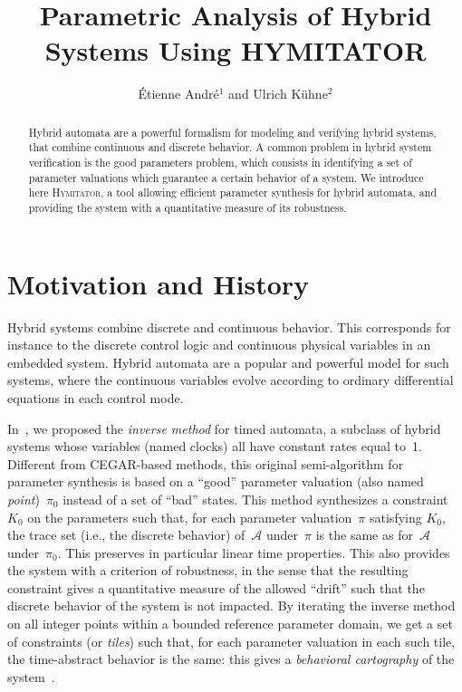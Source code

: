 \documentclass{llncs}
\title{Parametric Analysis of Hybrid Systems Using HYMITATOR}
\author{\'Etienne Andr\'e$^1$ and %
	Ulrich K\"uhne$^2$%
	}
\institute{$^1$LIPN, CNRS UMR 7030, Université Paris 13, France \\
$^2$Group for Computer Architecture, University of Bremen, Germany}
\newcommand{\A}{\mathcal{A}}
\newcommand{\Ko}{K_0}
\newcommand{\pio}{\pi_0}
\newcommand{\piprime}{\pi}
\newcommand{\hymitator}{\textsc{Hymitator}}
\newcommand{\commentaire}[1]{}
\begin{document}
\maketitle

\begin{abstract}
	Hybrid automata are a powerful formalism for modeling and verifying hybrid systems, that combine continuous and discrete behavior.
	A common problem in hybrid system verification is the good parameters problem, which consists in identifying a set of parameter valuations which guarantee a certain behavior of a system.
	We introduce here \hymitator{}, a tool allowing efficient parameter synthesis for hybrid automata, and providing the system with a quantitative measure of its robustness.
\end{abstract}


\commentaire{Version avec commentaires}


\section{Motivation and History}


Hybrid systems combine discrete and continuous behavior.
This corresponds for instance to the discrete control logic and continuous physical variables in an embedded system.
Hybrid automata are a popular and powerful model for such systems, where the continuous variables evolve according to ordinary differential equations in each control mode.

In~\cite{acef09}, we proposed the \emph{inverse method} for timed automata, a subclass of hybrid systems whose variables (named clocks) all have constant rates equal to~1.
Different from CEGAR-based methods, this original semi-algorithm for parameter synthesis is based on a ``good'' parameter valuation (also named \emph{point})~$\pio$ instead of a set of ``bad'' states.
This method synthesizes a constraint~$\Ko$ on the parameters such that, for each parameter valuation~$\piprime$ satisfying $\Ko$, the trace set (i.e., the discrete behavior) of~$\A$ under~$\piprime$ is the same as for~$\A$ under~$\pio$.
This preserves in particular linear time properties.
This also provides the system with a criterion of robustness, in the sense that the resulting constraint gives a quantitative measure of the allowed ``drift'' such that the discrete behavior of the system is not impacted.
By iterating the inverse method on all integer points within a bounded reference parameter domain, we get a set of constraints (or \emph{tiles}) such that, for each parameter valuation in each such tile, the time-abstract behavior is the same: this gives a \emph{behavioral cartography} of the system~\cite{af10}.
\end{document}
